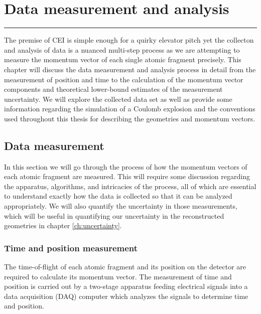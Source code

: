 \chapter{Data measurement and analysis} \label{ch:data}

\vspace{-1.5 em}
\begin{addmargin}[-0.5cm]{0cm}
  \minitoc
\end{addmargin}
\hrule
\vspace{1.5 em}

The premise of CEI is simple enough for a quirky elevator pitch yet the collecton and analysis of data is a nuanced multi-step process as we are attempting to measure the momentum vector of each single atomic fragment precisely. This chapter will discuss the data measurement and analysis process in detail from the measurement of position and time to the calculation of the momentum vector components and theoretical lower-bound estimates of the measurement uncertainty. We will explore the collected data set as well as provide some information regarding the simulation of a Coulomb explosion and the conventions used throughout this thesis for describing the geometries and momentum vectors.

\section{Data measurement} \label{sec:measurement}
In this section we will go through the process of how the momentum vectors of each atomic fragment are measured. This will require some discussion regarding the apparatus, algorithms, and intricacies of the process, all of which are essential to understand exactly how the data is collected so that it can be analyzed appropriately. We will also quantify the uncertainty in those measurements, which will be useful in quantifying our uncertainty in the reconstructed geometries in chapter \ref{ch:uncertainty}.

\subsection{Time and position measurement}
The time-of-flight of each atomic fragment and its position on the detector are required to calculate its momentum vector. The measurement of time and position is carried out by a two-stage apparatus feeding electrical signals into a data acquisition (DAQ) computer which analyzes the signals to determine time and position.

